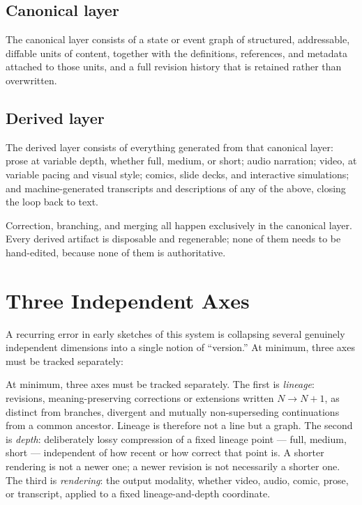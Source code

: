 \documentclass[11pt]{article}
\theoremstyle{definition}
\begin{document}
\subsection{Canonical layer}

The canonical layer consists of a state or event graph of structured, addressable, diffable units of content, together with the definitions, references, and metadata attached to those units, and a full revision history that is retained rather than overwritten.

\subsection{Derived layer}

The derived layer consists of everything generated from that canonical layer: prose at variable depth, whether full, medium, or short; audio narration; video, at variable pacing and visual style; comics, slide decks, and interactive simulations; and machine-generated transcripts and descriptions of any of the above, closing the loop back to text.

Correction, branching, and merging all happen exclusively in the canonical layer. Every derived artifact is disposable and regenerable; none of them needs to be hand-edited, because none of them is authoritative.

\section{Three Independent Axes}
\label{sec:three-axes}

A recurring error in early sketches of this system is collapsing several genuinely independent dimensions into a single notion of ``version.'' At minimum, three axes must be tracked separately:

At minimum, three axes must be tracked separately. The first is \emph{lineage}: revisions, meaning-preserving corrections or extensions written $N \to N+1$, as distinct from branches, divergent and mutually non-superseding continuations from a common ancestor. Lineage is therefore not a line but a graph. The second is \emph{depth}: deliberately lossy compression of a fixed lineage point --- full, medium, short --- independent of how recent or how correct that point is. A shorter rendering is not a newer one; a newer revision is not necessarily a shorter one. The third is \emph{rendering}: the output modality, whether video, audio, comic, prose, or transcript, applied to a fixed lineage-and-depth coordinate.
\end{document}
